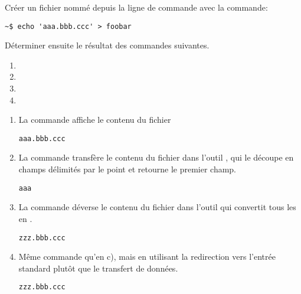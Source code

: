 \begin{exercice}
  Créer un fichier nommé  depuis la ligne de commande
  avec la commande:
  \begin{Schunk}
\begin{Verbatim}
~$ echo 'aaa.bbb.ccc' > foobar
\end{Verbatim}
  \end{Schunk} %
  Déterminer ensuite le résultat des commandes suivantes.
  \begin{enumerate}
  \item {}
  \item {}
  \item {}
  \item {}
  \end{enumerate}
  \begin{sol}
    \begin{enumerate}
    \item La commande affiche le contenu du fichier 
      \begin{Schunk}
\begin{Verbatim}
aaa.bbb.ccc
\end{Verbatim}
      \end{Schunk}
    \item La commande transfère le contenu du fichier 
      dans l'outil , qui le découpe en champs délimités par
      le point et retourne le premier champ.
      \begin{Schunk}
\begin{Verbatim}
aaa
\end{Verbatim}
      \end{Schunk}
    \item La commande déverse le contenu du fichier  dans
      l'outil  qui convertit tous les  en .
      \begin{Schunk}
\begin{Verbatim}
zzz.bbb.ccc
\end{Verbatim}
      \end{Schunk}
    \item Même commande qu'en c), mais en utilisant la redirection
      vers l'entrée standard plutôt que le transfert de données.
      \begin{Schunk}
\begin{Verbatim}
zzz.bbb.ccc
\end{Verbatim}
      \end{Schunk}
    \end{enumerate}
  \end{sol}
\end{exercice}


